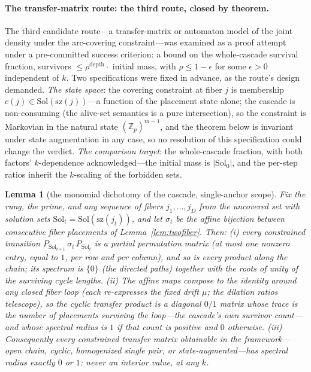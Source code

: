 \documentclass[11pt,a4paper]{article}
\numberwithin{equation}{section}
\theoremstyle{plain}
\newtheorem{lemma}[theorem]{Lemma}
\theoremstyle{definition}
\theoremstyle{remark}
\newcommand{\Z}{\mathbb{Z}}
\begin{document}
\paragraph{The transfer-matrix route: the third route, closed by
theorem.}
The third candidate route---a transfer-matrix or automaton model of the
joint density under the arc-covering constraint---was examined as a
proof attempt under a pre-committed success criterion: a bound on the
whole-cascade survival fraction, survivors $\le\rho^{\mathrm{depth}}
\cdot$ initial mass, with $\rho\le 1-\epsilon$ for some $\epsilon>0$
independent of $k$. Two specifications were fixed in advance,
as the route's design demanded. \emph{The state space}: the covering
constraint at fiber $j$ is membership
$c(j)\in\mathrm{Sol}(\mathrm{sz}(j))$---a function of the placement
state alone; the cascade is non-consuming (the alive-set semantics is
a pure intersection), so the constraint is Markovian in the natural
state $(\Z_p)^{m-1}$, and the theorem below is invariant under state
augmentation in any case, so no resolution of this specification could
change the verdict. \emph{The comparison target}: the whole-cascade
fraction, with both factors' $k$-dependence acknowledged---the initial
mass is $|\mathrm{Sol}_0|$, and the per-step ratios inherit the
$k$-scaling of the forbidden sets.

\begin{lemma}[the monomial dichotomy of the cascade, single-anchor scope]\label{lem:monomial}
Fix the rung, the prime, and any sequence of fibers $j_1,\dots,j_D$
from the uncovered set with solution sets
$\mathrm{Sol}_t=\mathrm{Sol}(\mathrm{sz}(j_t))$, and let $\sigma_t$
be the affine bijection between consecutive fiber placements of
Lemma~\ref{lem:twofiber}. Then: \emph{(i)} every constrained
transition $P_{\mathrm{Sol}_{t+1}}\,\sigma_t\,P_{\mathrm{Sol}_t}$ is
a partial permutation matrix (at most one nonzero entry, equal to $1$,
per row and per column), and so is every product along the chain; its
spectrum is $\{0\}$ (the directed paths) together with the roots of
unity of the surviving cycle lengths. \emph{(ii)} The affine maps
compose to the identity around any closed fiber loop (each re-expresses
the fixed drift $\mu$; the dilation ratios telescope), so the cyclic
transfer product is a diagonal $0/1$ matrix whose trace is the number
of placements surviving the loop---the cascade's own survivor
count---and whose spectral radius is $1$ if that count is positive and
$0$ otherwise. \emph{(iii)} Consequently every constrained transfer
matrix obtainable in the framework---open chain, cyclic, homogenized
single pair, or state-augmented---has spectral radius exactly $0$ or
$1$: never an interior value, at any $k$.
\end{lemma}
\end{document}
